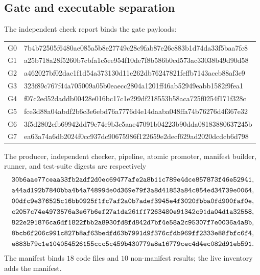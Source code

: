 \subsection{Gate and executable separation}

The independent check report binds the gate payloads:
\begin{center}
\scriptsize
\begin{tabular}{@{}c>{\ttfamily}l@{}}
G0&7b4b72505f6480ae085a5b8e27749c28c9fab87e26c883b1d74da33f5baa7fc8\\
G1&a25b718a28f5260b7cbfa1c5ee954f10de7f8b586b0cd573ac33038b49d90d58\\
G2&a462027bf02dac1f1d54a373130d11e262db76247821feffb7143accb88af3e9\\
G3&323f89c767f44a705009a05b0eaecc2804a1201ff46ab52949eabb1582f9fea1\\
G4&f07c2ed52daddb00428e016bc17c1e299df218553b58aca725f0254f171f328c\\
G5&fce3d88a04abdf2b6c3e6ebd76a7776d4e14daaba048ffa74b76276d4f367e32\\
G6&3f5d2802efb69942dd79e74e9b3c5aae47091b04223b90dda08183880637245b\\
G7&ea63a74a6db2024f0cc937dc90675986f122659e2decf629ad2020dcdcb6d798\\
\end{tabular}
\end{center}

The producer, independent checker, pipeline, atomic promoter, manifest
builder, runner, and test-suite digests are respectively
\[
\begin{gathered}
\texttt{30b6aae77ceaa33fb2adf2d0ec69477afe2a8b11c789e4dce857873f46e52941},\\
\texttt{a44ad192b7840bba4b4a74899de0d369e79f3a8d41853a84c854ed34739e0064},\\
\texttt{00dfc9e376525c16bb0925f1fc7af2a0b7adef3945e4f3020fbba0fd900faf0e},\\
\texttt{c2057c74e4973576a3e67b6ef27a1da261ff7263480e91342c91da04d1a32558},\\
\texttt{822e291876ca6df1822fbb2a8930fd8fd842d7bf4e58a2c95307f7e0036a4a8b},\\
\texttt{8bcb6f206c991c827b8af63bedfd63b7991d9f376cfdb969ff2333e88fbfc6f4},\\
\texttt{e883b79c1e104054526155ccc5c459b430779a8a16779cec4d4ec082d91eb591}.
\end{gathered}
\]
The manifest binds \(18\) code files and \(10\) non-manifest results; the
live inventory adds the manifest.

